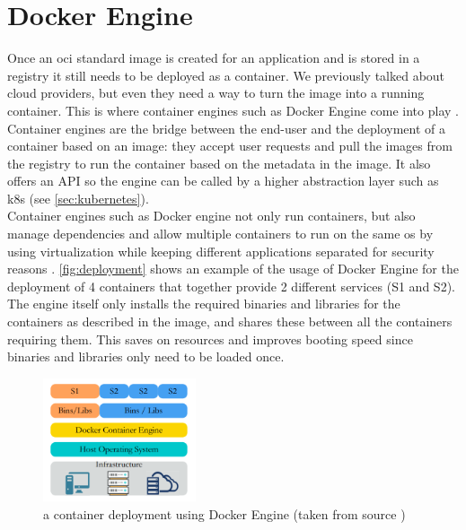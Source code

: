 \section{Docker Engine} \label{sec:containerruntime}
Once an \acrshort{oci} standard image is created for an application and is stored in a registry it still needs to be deployed as a container. We previously talked about cloud providers, but even they need a way to turn the image into a running container. This is where container engines such as Docker Engine come into play \cite{dockerengine}. Container engines are the bridge between the end-user and the deployment of a container based on an image: they accept user requests and pull the images from the registry to run the container based on the metadata in the image. It also offers an API so the engine can be called by a higher abstraction layer such as \acrshort{k8s} (see \autoref{sec:kubernetes}). 
\\[10pt]

Container engines such as Docker engine not only run containers, but also manage dependencies and allow multiple containers to run on the same \acrshort{os} by using virtualization while keeping different applications separated for security reasons \cite{cnwiki}. \autoref{fig:deployment} shows an example of the usage of Docker Engine for the deployment of 4 containers that together provide 2 different services (S1 and S2). The engine itself only installs the required binaries and libraries for the containers as described in the image, and shares these between all the containers requiring them. This saves on resources and improves booting speed since binaries and libraries only need to be loaded once.
\\[10pt]

\begin{figure}[htbp]
  \centering
  \includegraphics[width=0.4\textwidth]{images/docker-containers.png} 
  \caption{a container deployment using Docker Engine (taken from source \cite{resman})}
  \label{fig:deployment}
\end{figure}

